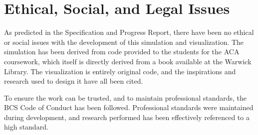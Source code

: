 
\chapter{Ethical, Social, and Legal Issues}
\label{sec:EthicalSocialLegal} 
As predicted in the Specification and Progress Report, there have been no ethical or social issues with the development of this simulation and visualization.
The simulation has been derived from code provided to the students for the ACA coursework\cite{modules:CS257Coursework}, which itself is directly derived from a book\cite{book:griebel1998numerical} available at the Warwick Library\cite{ethics:WarwickLibraryFluidSimBook}.
The visualization is entirely original code, and the inspirations and research used to design it have all been cited.


To ensure the work can be trusted, and to maintain professional standards, the BCS Code of Conduct\cite{ethics:BCSCodeOfConduct} has been followed.
Professional standards were maintained during development, and research performed has been effectively referenced to a high standard.

